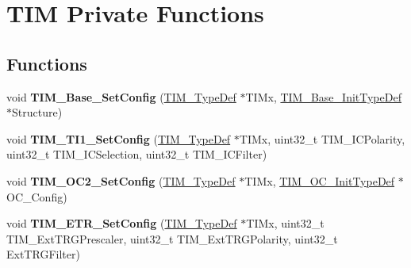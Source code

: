 \hypertarget{group___t_i_m___private___functions}{}\section{T\+IM Private Functions}
\label{group___t_i_m___private___functions}
\subsection*{Functions}
\begin{DoxyCompactItemize}
\item 
\mbox{\label{group___t_i_m___private___functions_ga057e4b4da135186e8fb88327c5fd0684}} 
void {\bfseries T\+I\+M\+\_\+\+Base\+\_\+\+Set\+Config} (\mbox{\hyperlink{struct_t_i_m___type_def}{T\+I\+M\+\_\+\+Type\+Def}} $\ast$T\+I\+Mx, \mbox{\hyperlink{struct_t_i_m___base___init_type_def}{T\+I\+M\+\_\+\+Base\+\_\+\+Init\+Type\+Def}} $\ast$Structure)
\item 
\mbox{\label{group___t_i_m___private___functions_ga83c847710a92f0558c862dd0dc889ff3}} 
void {\bfseries T\+I\+M\+\_\+\+T\+I1\+\_\+\+Set\+Config} (\mbox{\hyperlink{struct_t_i_m___type_def}{T\+I\+M\+\_\+\+Type\+Def}} $\ast$T\+I\+Mx, uint32\+\_\+t T\+I\+M\+\_\+\+I\+C\+Polarity, uint32\+\_\+t T\+I\+M\+\_\+\+I\+C\+Selection, uint32\+\_\+t T\+I\+M\+\_\+\+I\+C\+Filter)
\item 
\mbox{\label{group___t_i_m___private___functions_ga20370137a5c000fa4739d30669e67b8c}} 
void {\bfseries T\+I\+M\+\_\+\+O\+C2\+\_\+\+Set\+Config} (\mbox{\hyperlink{struct_t_i_m___type_def}{T\+I\+M\+\_\+\+Type\+Def}} $\ast$T\+I\+Mx, \mbox{\hyperlink{struct_t_i_m___o_c___init_type_def}{T\+I\+M\+\_\+\+O\+C\+\_\+\+Init\+Type\+Def}} $\ast$O\+C\+\_\+\+Config)
\item 
\mbox{\label{group___t_i_m___private___functions_ga0dc6b90093e2510142a5b21d75e025e0}} 
void {\bfseries T\+I\+M\+\_\+\+E\+T\+R\+\_\+\+Set\+Config} (\mbox{\hyperlink{struct_t_i_m___type_def}{T\+I\+M\+\_\+\+Type\+Def}} $\ast$T\+I\+Mx, uint32\+\_\+t T\+I\+M\+\_\+\+Ext\+T\+R\+G\+Prescaler, uint32\+\_\+t T\+I\+M\+\_\+\+Ext\+T\+R\+G\+Polarity, uint32\+\_\+t Ext\+T\+R\+G\+Filter)
\item 

\end{DoxyCompactItemize}
